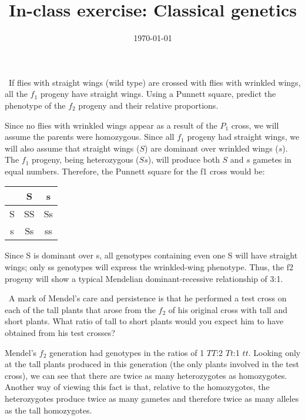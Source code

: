 \documentclass[hw,addpoints,noanswers]{exam}
\title{In-class exercise: Classical genetics}
\date{\today}
\author{\mobeardInstructorShort}
\begin{document}
\maketitle

\begin{questions}
\question If flies with straight wings (wild type) are crossed with flies with wrinkled wings, all the $f_1$ progeny have straight wings. Using a Punnett square, predict the phenotype of the $f_2$ progeny and their relative proportions.
\begin{solution}
Since no flies with wrinkled wings appear as a result of the $P_1$ cross, we will assume the parents were homozygous. Since all $f_1$ progeny had straight wings, we will also assume that straight wings ($S$) are dominant over wrinkled wings ($s$). The $f_1$ progeny, being heterozygous ($Ss$), will produce both $S$ and $s$ gametes in equal numbers. Therefore, the Punnett square for the f1 cross would be:
\begin{center}
\begin{tabular}{|c|c|c|}
\hline
& S & s \\
\hline
S & SS & Ss \\
\hline
s & Ss & ss \\
\hline
\end{tabular}
\end{center}
Since S is dominant over s, all genotypes containing even one S will have straight wings; only ss genotypes will express the wrinkled-wing phenotype. Thus, the f2 progeny will show a typical Mendelian dominant-recessive relationship of 3:1.
\end{solution}

\question A mark of Mendel’s care and persistence is that he performed a test cross on each of the tall plants that arose from the $f_2$ of his original cross with tall and short plants. What ratio of tall to short plants would you expect him to have obtained from his test crosses?
\begin{solution}
Mendel’s $f_2$ generation had genotypes in the ratios of 1 $TT$:2 $Tt$:1 $tt$. Looking only at the tall plants produced in this generation (the only plants involved in the test cross), we can see that there are twice as many heterozygotes as homozygotes. Another way of viewing this fact is that, relative to the homozygotes, the heterozygotes produce twice as many gametes and therefore twice as many alleles as the tall homozygotes.


\end{solution}
\end{questions}
\end{document}
